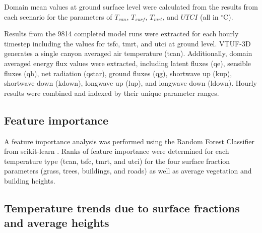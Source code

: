 \documentclass[final,3p,times,authoryear]{elsarticle}
\begin{document}
Domain mean values at ground surface level were calculated from the results from each scenario for the parameters of $T_{can}$, $T_{surf}$, $T_{mrt}$, and $UTCI$ (all in $^{\circ}$C). 

Results from the 9814 completed model runs were extracted for each hourly timestep including the values for \gls{tsfc}, \gls{tmrt}, and \gls{utci} at ground level. VTUF-3D generates a single canyon averaged air temperature (\gls{tcan}). Additionally, domain averaged energy flux values were extracted, including latent fluxes (\gls{qe}), sensible fluxes (\gls{qh}), net radiation (\gls{qstar}), ground fluxes (\gls{qg}), shortwave up (\gls{kup}), shortwave down (\gls{kdown}), longwave up (\gls{lup}), and longwave down (\gls{ldown}). Hourly results were combined and indexed by their unique parameter ranges.

\subsection{Feature importance}\label{sec:methodsfeat}
%

A feature importance analysis was performed using the Random Forest Classifier from  scikit-learn \citep{scikit-learn}. Ranks of feature importance were determined for each temperature type (\gls{tcan}, \gls{tsfc}, \gls{tmrt}, and \gls{utci}) for the four surface fraction parameters (grass, trees, buildings, and roads) as well as average vegetation and building heights.


\subsection{Temperature trends due to surface fractions and average heights}\label{sec:methodstempvspercent}
\end{document}
